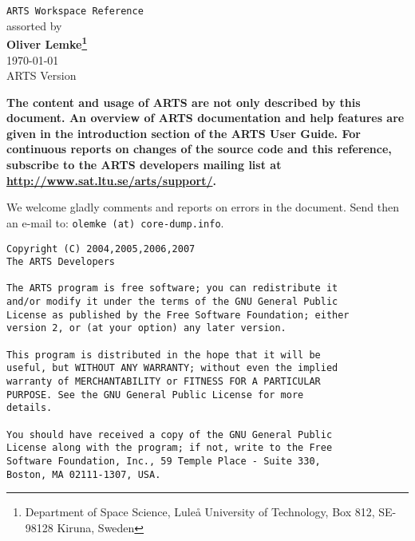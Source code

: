 





%
\renewcommand{\thepage}{title \arabic{page}} 

\thispagestyle{plain}
\begin{center}
  \vspace*{2cm}
  {\Huge \verb|ARTS Workspace Reference|\\}
  \vspace*{1cm}
  {\large assorted by \\}
  \vspace*{1cm}
  {\Large \bf Oliver Lemke\footnote{
      Department of Space Science, Lule{\aa} University of Technology,
      Box 812, SE-98128 Kiruna, Sweden}  
    }\\
   \vspace*{2cm}
   {\large \today\\
    ARTS Version 
   }
\end{center}
\vspace*{4cm}
{\normalsize \bf
  \noindent
  The content and usage of ARTS are not only described by this
  document. An overview of ARTS documentation and help features are
  given in the introduction section of the ARTS User Guide. For continuous
  reports on changes of the source code and this reference, subscribe to
  the ARTS developers mailing list at \url{http://www.sat.ltu.se/arts/support/}.

  We welcome gladly comments and reports on errors in the document.
  Send then an e-mail to: \verb|olemke (at) core-dump.info|.
}

\newpage                          
\thispagestyle{empty}
\vspace*{\fill}
\noindent
\begin{verbatim}
Copyright (C) 2004,2005,2006,2007
The ARTS Developers

The ARTS program is free software; you can redistribute it
and/or modify it under the terms of the GNU General Public
License as published by the Free Software Foundation; either
version 2, or (at your option) any later version.

This program is distributed in the hope that it will be
useful, but WITHOUT ANY WARRANTY; without even the implied
warranty of MERCHANTABILITY or FITNESS FOR A PARTICULAR
PURPOSE. See the GNU General Public License for more
details. 

You should have received a copy of the GNU General Public
License along with the program; if not, write to the Free
Software Foundation, Inc., 59 Temple Place - Suite 330,
Boston, MA 02111-1307, USA. 
\end{verbatim}



